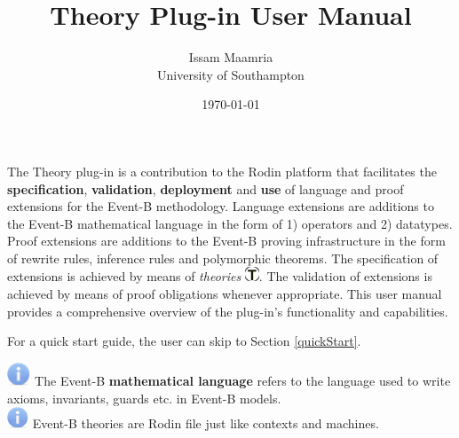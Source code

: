 \documentclass{article}      %
\title{Theory Plug-in User Manual}  %
\author{Issam Maamria \\ University of Southampton}      %
\date{\today}
\begin{document}

\maketitle
The Theory plug-in is a contribution to the Rodin platform that facilitates the \textbf{specification}, \textbf{validation}, \textbf{deployment} and \textbf{use} of language and proof extensions for the Event-B methodology. Language extensions are additions to the Event-B mathematical language in the form of 1) operators and 2) datatypes. Proof extensions are additions to the Event-B proving infrastructure in the form of rewrite rules, inference rules and polymorphic theorems. The specification of extensions is achieved by means of \textit{theories} \includegraphics{images/thy.png}. The validation of extensions is achieved by means of proof obligations whenever appropriate. This user manual provides a comprehensive overview of the plug-in's functionality and capabilities.
\par
For a quick start guide, the user can skip to Section \ref{quickStart}.

\includegraphics[width=7mm]{images/info.png} The Event-B \textbf{mathematical language} refers to the language used to write axioms, invariants, guards etc. in Event-B models.\\

\includegraphics{images/info.png} Event-B theories are Rodin file just like contexts and machines.
\end{document}

